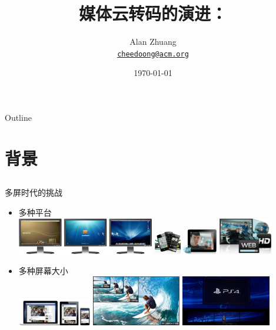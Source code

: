 \documentclass{beamer}
\title{媒体云转码的演进：\\\Small{MapReduce、DASH与稳定婚姻}}
\author{Alan Zhuang\\
\href{mailto:cheedoong@acm.org}{\nolinkurl{cheedoong@acm.org}}\\
}
\date{\today}
\begin{document}

\frame{\titlepage}

\section[Outline]{}
\begin{frame}{Outline}
\tableofcontents
\end{frame}

\section{背景}
\subsection{}
\begin{frame}{多屏时代的挑战}
\begin{itemize}
\item 多种平台\\ %
\includegraphics[height=1.6cm]{fig/PCs.png}\pause
\includegraphics[height=1.0cm]{fig/mobile-bc.png}\pause
\includegraphics[height=1.1cm]{fig/streaming-bc.png}\pause
\includegraphics[height=1.6cm]{fig/video_quality-bc.png} \pause
\item 多种屏幕大小\\ %
\includegraphics[height=1.2cm]{fig/screen_sizes.jpg}\pause
\includegraphics[height=2.2cm]{fig/480_to_4KVideo.jpg}\pause
\includegraphics[height=2.2cm]{fig/4k_video.jpg} \pause
\end{itemize}
\end{frame}
\end{document}
